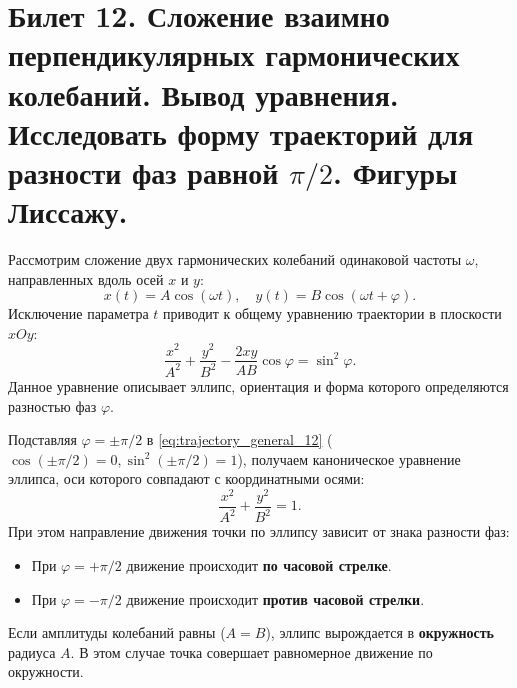 \section{Билет 12. Сложение взаимно перпендикулярных гармонических колебаний. Вывод уравнения. Исследовать форму траекторий для разности фаз равной $\pi/2$. Фигуры Лиссажу.}

\begin{definition}
Рассмотрим сложение двух гармонических колебаний одинаковой частоты $\omega$, направленных вдоль осей $x$ и $y$:
\begin{equation}
    x(t) = A \cos(\omega t), \quad y(t) = B \cos(\omega t + \varphi).
\end{equation}
Исключение параметра $t$ приводит к общему уравнению траектории в плоскости $xOy$:
\begin{equation}
    \frac{x^2}{A^2} + \frac{y^2}{B^2} - \frac{2xy}{AB}\cos\varphi = \sin^2\varphi. \label{eq:trajectory_general_12}
\end{equation}
Данное уравнение описывает эллипс, ориентация и форма которого определяются разностью фаз $\varphi$.
\end{definition}

\begin{property}[Случай $\varphi = \pm \pi/2$]
Подставляя $\varphi = \pm \pi/2$ в \eqref{eq:trajectory_general_12} ($\cos(\pm\pi/2) = 0, \sin^2(\pm\pi/2) = 1$), получаем каноническое уравнение эллипса, оси которого совпадают с координатными осями:
\begin{equation}
    \frac{x^2}{A^2} + \frac{y^2}{B^2} = 1. \label{eq:ellipse}
\end{equation}
При этом направление движения точки по эллипсу зависит от знака разности фаз:
\begin{itemize}
    \item При $\varphi = +\pi/2$ движение происходит \textbf{по часовой стрелке}.
    \item При $\varphi = -\pi/2$ движение происходит \textbf{против часовой стрелки}.
\end{itemize}
Если амплитуды колебаний равны ($A = B$), эллипс вырождается в \textbf{окружность} радиуса $A$. В этом случае точка совершает равномерное движение по окружности.
\end{property}

